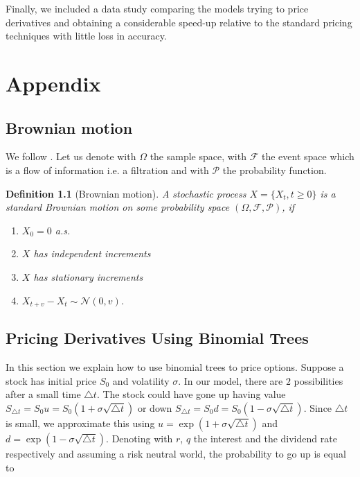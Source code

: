 \documentclass[12pt,a4paper,oneside]{book}
\newtheorem{Definition}{Definition}
\begin{document}
Finally, we included a data study comparing the models trying to price derivatives and obtaining a considerable speed-up relative to the standard pricing techniques with little loss in accuracy. 












\chapter{Appendix} 

\section{Brownian motion}\label{Brownian_Motion}

We follow \cite{wimschoutensvg}. Let us denote with $\Omega$ the sample space, with $\mathcal{F}$ the event space which is a flow of information i.e. a filtration and with $\mathcal{P}$ the probability function.

\begin{Definition}[Brownian motion]
A stochastic process $X = \{ X_t, t \geq 0 \}$ is a standard Brownian motion on some probability space $(\Omega,\mathcal{F}, \mathcal{P})$, if

\begin{enumerate}
    \item $X_0 = 0$ a.s.
    \item $X$ has independent increments
    \item $X$ has stationary increments
    \item $X_{t+v} - X_t \sim \mathcal{N}(0,v)$.
\end{enumerate}
\end{Definition}


\section{Pricing Derivatives Using Binomial Trees}\label{appendix_tree}

In this section we explain how to use binomial trees to price options. Suppose a stock has initial price $S_0$ and volatility $\sigma$. In our model, there are $2$ possibilities after a small time $\triangle t$. The stock could have gone up having value $S_{\triangle t} = S_0 u= S_0(1+ \sigma \sqrt {\triangle t})$ or down $S_{\triangle t} = S_0 d= S_0(1- \sigma \sqrt{\triangle t})$. Since $\triangle t$ is small, we approximate this using $u = \exp{( 1+ \sigma \sqrt {\triangle t})}$ and $d = \exp{(1- \sigma \sqrt{\triangle t})}$. Denoting with $r$, $q$ the interest and  the dividend rate respectively and assuming a risk neutral world, the probability to go up is equal to
\end{document}
